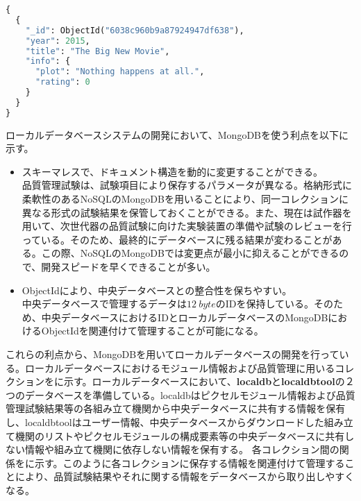 \begin{lstlisting}[caption=MongoDBのドキュメントの例,label=mongodocument, language=Python]
{
  {
    "_id": ObjectId("6038c960b9a87924947df638"),
    "year": 2015,
    "title": "The Big New Movie",
    "info": {
      "plot": "Nothing happens at all.",
      "rating": 0
    }
  }
}
\end{lstlisting}


ローカルデータベースシステムの開発において、MongoDBを使う利点を以下に示す。
\begin{itemize}
  \item スキーマレスで、ドキュメント構造を動的に変更することができる。 \\
  品質管理試験は、試験項目により保存するパラメータが異なる。格納形式に柔軟性のあるNoSQLのMongoDBを用いることにより、同一コレクションに異なる形式の試験結果を保管しておくことができる。また、現在は試作器を用いて、次世代器の品質試験に向けた実験装置の準備や試験のレビューを行っている。そのため、最終的にデータベースに残る結果が変わることがある。この際、NoSQLのMongoDBでは変更点が最小に抑えることができるので、開発スピードを早くできることが多い。
  \item ObjectIdにより、中央データベースとの整合性を保ちやすい。 \\
  中央データベースで管理するデータは$12\ \si{byte}$のIDを保持している。そのため、中央データベースにおけるIDとローカルデータベースのMongoDBにおけるObjectIdを関連付けて管理することが可能になる。
\end{itemize}

これらの利点から、MongoDBを用いてローカルデータベースの開発を行っている。ローカルデータベースにおけるモジュール情報および品質管理に用いるコレクションをに示す。ローカルデータベースにおいて、\textbf{localdb}と\textbf{localdbtool}の２つのデータベースを準備している。localdbはピクセルモジュール情報および品質管理試験結果等の各組み立て機関から中央データベースに共有する情報を保有し、localdbtoolはユーザー情報、中央データベースからダウンロードした組み立て機関のリストやピクセルモジュールの構成要素等の中央データベースに共有しない情報や組み立て機関に依存しない情報を保有する。
各コレクション間の関係をに示す。このように各コレクションに保存する情報を関連付けて管理することにより、品質試験結果やそれに関する情報をデータベースから取り出しやすくなる。

